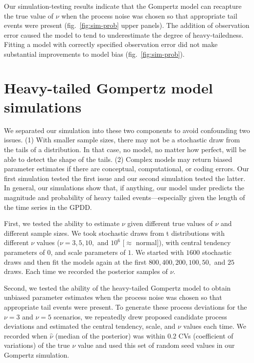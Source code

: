 \documentclass[12pt]{article}
\begin{document}
Our simulation-testing results indicate that the Gompertz model can recapture the true value of \(\nu\) when the process noise was chosen so that appropriate tail events were present (fig.~\ref{fig:sim-prob} upper panels). The addition of observation error caused the model to tend to underestimate the degree of heavy-tailedness. Fitting a model with correctly specified observation error did not make substantial improvements to model bias (fig.~\ref{fig:sim-prob}).

\section{Heavy-tailed Gompertz model simulations}

We separated our simulation into these two components to avoid confounding two
issues. (1) With smaller sample sizes, there may not be a stochastic draw from
the tails of a distribution. In that case, no model, no matter how perfect,
will be able to detect the shape of the tails. (2) Complex models may return
biased parameter estimates if there are conceptual, computational, or coding
errors. Our first simulation tested the first issue and our second simulation
tested the latter. In general, our simulations show that, if anything, our
model under predicts the magnitude and probability of heavy tailed
events---especially given the length of the time series in the GPDD.

First, we tested the ability to estimate $\nu$ given different true values of
$\nu$ and different sample sizes. We took stochastic draws from t
distributions with different $\nu$ values ($\nu = 3, 5, 10,$ and $10^6$
[$\approx$ normal]), with central tendency parameters of $0$, and scale
parameters of $1$. We started with $1600$ stochastic draws and then fit the
models again at the first $800, 400, 200, 100, 50,$ and $25$ draws. Each time
we recorded the posterior samples of $\nu$.

Second, we tested the ability of the heavy-tailed Gompertz model to obtain
unbiased parameter estimates when the process noise was chosen so that
appropriate tail events were present. To generate these process deviations for
the $\nu = 3$ and $\nu = 5$ scenarios, we repeatedly drew proposed candidate
process deviations and estimated the central tendency, scale, and $\nu$ values
each time. We recorded when $\hat{\nu}$ (median of the posterior) was within
$0.2$ CVs (coefficient of variations) of the true $\nu$ value and used this
set of random seed values in our Gompertz simulation.
\end{document}
